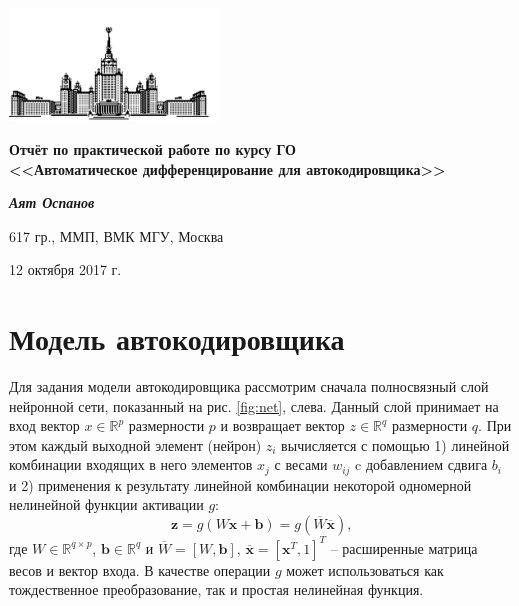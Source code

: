 \documentclass[12pt, a4paper]{article}
\begin{document}
    \begin{singlespace}
    \begin{center}
        \includegraphics[height=3cm]{msu.png}

        {\large\textbf{Отчёт по практической работе по курсу ГО\\
        <<Автоматическое дифференцирование для автокодировщика>>}}

        \vspace{0.3cm}

        \textit{\textbf{Аят Оспанов}}

        617 гр., ММП, ВМК МГУ, Москва

        12 октября 2017 г.
    \end{center}
    \end{singlespace}

    \tableofcontents

    \section{Модель автокодировщика}
        Для задания модели автокодировщика рассмотрим сначала полносвязный слой нейронной сети, показанный на рис. \ref{fig:net}, слева. Данный слой принимает на вход вектор $x \in \mathbb{R}^p$ размерности $p$ и возвращает вектор $z \in \mathbb{R}^q$ размерности $q$. При этом каждый выходной элемент (нейрон) $z_i$ вычисляется с помощью 1) линейной комбинации входящих в него элементов $x_j$ с весами $w_{ij}$ c добавлением сдвига $b_i$ и 2) применения к результату линейной комбинации некоторой одномерной нелинейной функции активации $g$:
        $$\boldsymbol{z} = g(W\boldsymbol{x} + \boldsymbol{b}) = g(\overline{W}\overline{\boldsymbol{x}}) \text{,}$$
        где $W \in \mathbb{R}^{q\times p}$, $\boldsymbol{b} \in \mathbb{R}^q$ и $\overline{W} = [W, \boldsymbol{b}]$, $\overline{\boldsymbol{x}} = [\boldsymbol{x}^T, 1]^T$ -- расширенные матрица весов и вектор входа. В качестве операции $g$ может использоваться как тождественное преобразование, так и простая нелинейная функция.
\end{document}
